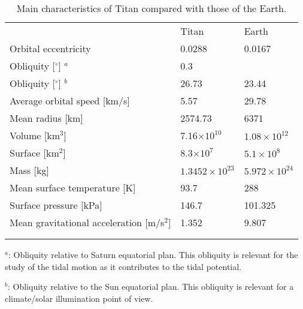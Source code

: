 \begin{table}
\centering
\begin{threeparttable}
\caption{Main characteristics of Titan compared with those of the Earth. \label{tab:intro:charac}}
\begin{tabular}{p{}p{2.3cm}p{2.3cm}} \hline\noalign{\smallskip}

{}&{Titan}&{Earth} \\ \noalign{\smallskip}\hline\noalign{\smallskip}

{Orbital eccentricity}&{0.0288} &{0.0167}\\ 
{Obliquity [$^\circ$] $^a$}&{0.3} &{}\\ 
{Obliquity [$^\circ$] $^b$}&{26.73} &{23.44}\\ 
{Average orbital speed [km/s]}&{5.57} &{29.78}\\ 
{Mean radius [km]} &{2574.73}&{6371} \\ 
{Volume [km$^3$]}&{7.16$\times10^{10}$} &{$1.08\times10^{12}$}\\ 
{Surface [km$^2$]}&{8.3$\times10^7$} &{$5.1\times10^8$}\\ 
{Mass [kg]}&{$1.3452\times10^{23}$} &{$5.972\times10^{24}$}\\
{Mean surface temperature [K]}&{93.7} &{288}\\
{Surface pressure [kPa]}&{146.7} &{101.325}\\
{Mean gravitational acceleration [m/s$^{2}$]}&{1.352} &{9.807}\\
 \\\noalign{\smallskip}\hline
\end{tabular}
\begin{tablenotes}
\small
\item $^a$: Obliquity relative to Saturn equatorial plan. This obliquity is relevant for the study of the tidal motion as it contributes to the tidal potential.
\item $^b$: Obliquity relative to the Sun equatorial plan. This obliquity is relevant for a climate/solar illumination point of view.
\end{tablenotes}
\end{threeparttable}
\end{table}

